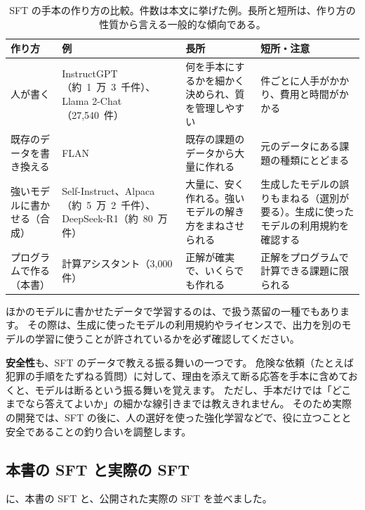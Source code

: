 \begin{table}[tbp]
\centering
\caption{SFT の手本の作り方の比較。件数は本文に挙げた例。長所と短所は、作り方の性質から言える一般的な傾向である。}
\label{tab:post-data-sources}
\footnotesize
\renewcommand{\arraystretch}{1.2}
\begin{tabularx}{\linewidth}{>{\raggedright\arraybackslash}p{17mm}>{\raggedright\arraybackslash}p{37mm}>{\raggedright\arraybackslash}X>{\raggedright\arraybackslash}X}
\toprule
作り方 & 例 & 長所 & 短所・注意 \\
\midrule
人が書く & InstructGPT（\mbox{約 1 万 3 千件}）、Llama 2-Chat（\mbox{27,540 件}） & 何を手本にするかを細かく決められ、質を管理しやすい & 1 件ごとに人手がかかり、費用と時間がかかる \\
既存のデータを書き換える & FLAN & 既存の課題のデータから大量に作れる & 元のデータにある課題の種類にとどまる \\
強いモデルに書かせる（合成） & Self-Instruct、Alpaca（\mbox{約 5 万 2 千件}）、DeepSeek-R1（\mbox{約 80 万件}） & 大量に、安く作れる。強いモデルの解き方をまねさせられる & 生成したモデルの誤りもまねる（選別が要る）。生成に使ったモデルの利用規約を確認する \\
プログラムで作る（本書） & 計算アシスタント（3,000 件） & 正解が確実で、いくらでも作れる & 正解をプログラムで計算できる課題に限られる \\
\bottomrule
\end{tabularx}
\end{table}

ほかのモデルに書かせたデータで学習するのは、で扱う蒸留の一種でもあります。
その際は、生成に使ったモデルの利用規約やライセンスで、出力を別のモデルの学習に使うことが許されているかを必ず確認してください。

\textbf{安全性}も、SFT のデータで教える振る舞いの一つです。
危険な依頼（たとえば犯罪の手順をたずねる質問）に対して、理由を添えて断る応答を手本に含めておくと、モデルは断るという振る舞いを覚えます。
ただし、手本だけでは「どこまでなら答えてよいか」の細かな線引きまでは教えきれません。
そのため実際の開発では、SFT の後に、人の選好を使った強化学習などで、役に立つことと安全であることの釣り合いを調整します\cite{bai2022training,touvron2023llama2}。

\subsection{本書の SFT と実際の SFT}\label{sec:post-scale-compare}

に、本書の SFT と、公開された実際の SFT を並べました。

